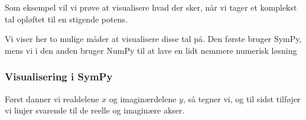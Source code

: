 \documentclass[letterpaper,10pt,english]{jupyterBook}
\begin{document}
Som eksempel vil vi prøve at visualisere hvad der sker, når vi tager et komplekst tal opløftet til en stigende potens.

\begin{sphinxVerbatim}[commandchars=\\\{\}]
   

    

  \PYG{p}{[}\PYG{p}{]}
    
      
    
\end{sphinxVerbatim}

\noindent{}

Vi viser her to mulige måder at visualisere disse tal på. Den første bruger SymPy, mens vi i den anden bruger NumPy til at lave en lidt nemmere numerisk løsning


\subsubsection{Visualisering i SymPy}
\label{\detokenize{notebooks/sympy/Notebook_kompleks:visualisering-i-sympy}}
Først danner vi realdelene \(x\) og imaginærdelene \(y\), så tegner vi, og til sidst tilføjer vi linjer svarende til de reelle og imaginære akser.
\end{document}
